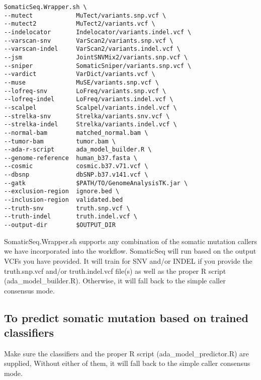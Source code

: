 \documentclass[10pt,letterpaper]{article}
\begin{document}
\begin{sloppypar}
\begin{lstlisting}
SomaticSeq.Wrapper.sh \
--mutect            MuTect/variants.snp.vcf \
--mutect2           MuTect2/variants.vcf \
--indelocator       Indelocator/variants.indel.vcf \
--varscan-snv       VarScan2/variants.snp.vcf \
--varscan-indel     VarScan2/variants.indel.vcf \
--jsm               JointSNVMix2/variants.snp.vcf \
--sniper            SomaticSniper/variants.snp.vcf \
--vardict           VarDict/variants.vcf \
--muse              MuSE/variants.snp.vcf \
--lofreq-snv        LoFreq/variants.snp.vcf \
--lofreq-indel      LoFreq/variants.indel.vcf \
--scalpel           Scalpel/variants.indel.vcf \
--strelka-snv       Strelka/variants.snv.vcf \
--strelka-indel     Strelka/variants.indel.vcf \
--normal-bam        matched_normal.bam \
--tumor-bam         tumor.bam \
--ada-r-script      ada_model_builder.R \
--genome-reference  human_b37.fasta \
--cosmic            cosmic.b37.v71.vcf \
--dbsnp             dbSNP.b37.v141.vcf \
--gatk              $PATH/TO/GenomeAnalysisTK.jar \
--exclusion-region  ignore.bed \
--inclusion-region  validated.bed
--truth-snv         truth.snp.vcf \
--truth-indel       truth.indel.vcf \
--output-dir        $OUTPUT_DIR
\end{lstlisting}

SomaticSeq.Wrapper.sh supports any combination of the somatic mutation callers we have incorporated into the workflow. SomaticSeq will run based on the output VCFs you have provided. It will train for SNV and/or INDEL if you provide the truth.snp.vcf and/or truth.indel.vcf file(s) as well as the proper R script (ada\_model\_builder.R). Otherwise, it will fall back to the simple caller consensus mode.




\subsection{To predict somatic mutation based on trained classifiers}

Make sure the classifiers and the proper R script (ada\_model\_predictor.R) are supplied, Without either of them, it will fall back to the simple caller consensus mode.



\end{sloppypar}
\end{document}
